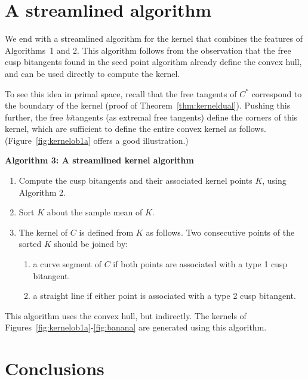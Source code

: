 \documentclass{sig-alternate}
\begin{document}
\section{A streamlined algorithm}
\label{sec:second}

We end with a streamlined algorithm for the kernel 
that combines the features of Algorithms~1 and 2.
This algorithm follows from the observation that the 
free cusp bitangents found in the seed point algorithm
already define the convex hull, and can be used directly
to compute the kernel.

To see this idea in primal space,
recall that the free tangents of $C^*$ correspond to the boundary of the kernel 
(proof of Theorem~\ref{thm:kerneldual}).
Pushing this further, the free {\em bi}tangents (as extremal free tangents) 
define the corners of this kernel, which are sufficient to define the entire convex kernel as follows.
(Figure~\ref{fig:kernelob1a} offers a good illustration.)

\vspace{.2in}

\centerline{{\bf Algorithm 3: A streamlined kernel algorithm}}
\nopagebreak
\begin{enumerate}
\item Compute the cusp bitangents and their associated kernel points $K$, using
	Algorithm 2.
\item Sort $K$ about the sample mean of $K$.
\item The kernel of $C$ is defined from $K$ as follows.
      Two consecutive points of the sorted $K$ should be joined by:
\begin{enumerate}
\item a curve segment of $C$ if both points are associated with a type 1
	cusp bitangent.
\item a straight line if either point is associated with a type 2 cusp bitangent.
\end{enumerate}
\end{enumerate}

\noindent This algorithm uses the convex hull, but indirectly.
The kernels of Figures~\ref{fig:kernelob1a}-\ref{fig:banana}
are generated using this algorithm.


\section{Conclusions}
\label{sec:conclude}
\end{document}
